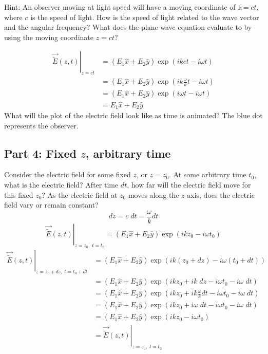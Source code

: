 \documentclass{article}
\begin{document}
Hint: An observer moving at light speed will have a moving coordinate of $z=ct$, where $c$ is the speed of light.  How is the speed of light related to the wave vector and the angular frequency?  What does the plane wave equation evaluate to by using the moving coordinate $z=ct$?

\begin{align}
     \left.\vec{\widetilde{E}}\left(z,t\right)\right\rvert_{z=ct} &= \left(E_1\hat{x} + E_2\hat{y}\right) \exp \left(ikct- i \omega t\right)  \\
     &= \left(E_1\hat{x} + E_2\hat{y}\right) \exp \left(ik\frac{\omega}{k}t - i \omega t\right) \\
     &= \left(E_1\hat{x} + E_2\hat{y}\right) \exp \left(i\omega t- i \omega t\right)   \\
     &= E_1\hat{x} + E_2\hat{y} 
\end{align}
What will the plot of the electric field look like as time is animated?  The blue dot represents the observer.

\subsection{Part 4: Fixed $z$, arbitrary time}
Consider the electric field for some fixed $z$, or $z=z_0$.  At some arbitrary time $t_0$, what is the electric field?  After time $dt$,  how far will the electric field move for this fixed $z_0$?  As the electric field at $z_0$ moves along the $z$-axis, does the electric field vary or remain constant?
\begin{equation}
    dz = c\;dt = \frac{\omega}{k}dt
\end{equation}
\begin{equation}
    \left.\vec{\widetilde{E}}\left(z,t\right)\right\rvert_{z=z_0,\;t=t_0} = \left(E_1\hat{x} + E_2\hat{y}\right) \exp \left(ikz_0- i \omega t_0\right)
\end{equation}
\begin{align}
     \left.\vec{\widetilde{E}}\left(z,t\right)\right\rvert_{z=z_0+dz,\;t=t_0+dt} &= \left(E_1\hat{x} + E_2\hat{y}\right) \exp \left(ik(z_0+dz)- i \omega (t_0+dt)\right)   \\
     &= \left(E_1\hat{x} + E_2\hat{y}\right) \exp \left(ikz_0+ik\;dz- i \omega t_0- i \omega\;dt\right)   \\
     &= \left(E_1\hat{x} + E_2\hat{y}\right) \exp \left(ikz_0+ik\frac{\omega}{k}dt- i \omega t_0- i \omega\;dt\right)   \\
     &= \left(E_1\hat{x} + E_2\hat{y}\right) \exp \left(ikz_0+i\omega\; dt- i \omega t_0- i \omega\;dt\right)   \\
     &= \left(E_1\hat{x} + E_2\hat{y}\right) \exp \left(ikz_0- i \omega t_0\right)   \\
     &=\left.\vec{\widetilde{E}}\left(z,t\right)\right\rvert_{z=z_0,\;t=t_0}
\end{align}
\end{document}
